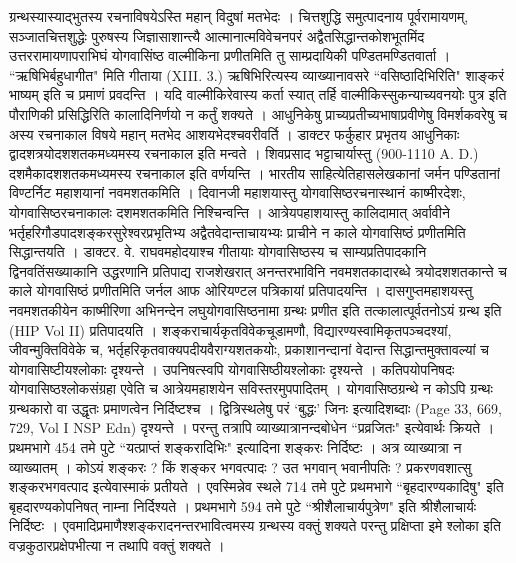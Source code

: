 ग्रन्थस्यास्याद्भुतस्य रचनाविषयेऽस्ति महान् विदुषां मतभेदः । चित्तशुद्धि समुत्पादनाय पूर्वरामायणम्, सञ्जातचित्तशुद्धेः पुरुषस्य जिज्ञासाशान्त्यै आत्मानात्मविवेचनपरं अद्वैतसिद्धान्तकोशभूतमिंद उत्तररामायणापराभिघं योगवासिंष्ठ वाल्मीकिना प्रणीतमिति तु साम्प्रदायिकी पण्डितमण्डितवार्ता । ``ऋषिभिर्बहुधागीत" मिति गीताया (XIII. 3.) ऋषिभिरित्यस्य व्याख्यानावसरे ``वसिष्ठादिभिरिति" शाङ्करं भाष्यम् इति च प्रमाणं प्रवदन्ति । यदि वाल्मीकिरेवास्य कर्ता स्यात् तर्हि वाल्मीकिस्सुकन्याच्यवनयोः पुत्र इति पौराणिकी प्रसिद्धिरिति कालादिनिर्णयो न कर्तुं शक्यते ।
आधुनिकेषु प्राच्यप्रतीच्यभाषाप्रवीणेषु विमर्शकवरेषु च अस्य रचनाकाल विषये महान् मतभेद आशयभेदश्चवरीवर्ति । डाक्टर फर्कुहार प्रभृतय आधुनिकाः द्वादशत्रयोदशशतकमध्यमस्य रचनाकाल इति मन्वते । शिवप्रसाद भट्टाचार्यास्तु (900-1110 A. D.) दशमैकादशशतकमध्यमस्य रचनाकाल इति वर्णयन्ति । भारतीय साहित्येतिहासलेखकानां जर्मन पण्डितानां विण्टर्निट महाशयानां नवमशतकमिति । दिवानजी महाशयास्तु योगवासिष्ठरचनास्थानं काष्मीरदेशः, योगवासिष्ठरचनाकालः दशमशतकमिति निश्चिन्वन्ति । आत्रेयपहाशयास्तु कालिदामात् अर्वावीने भर्तृहरिगौडपादशङ्करसुरेश्वरप्रभृतिभ्य अद्वैतवेदान्ताचायभ्यः प्राचीने न काले योगवासिष्ठं प्रणीतमिति सिद्धान्तयति । डाक्टर. वे. राघवमहोदयाश्च गीतायाः योगवासिष्ठस्य च साम्यप्रतिपादकानि द्विनवतिंसख्याकानि उद्धरणानि प्रतिपाद्य राजशेखरात् अनन्तरभाविनि नवमशतकादारब्धे त्रयोदशशतकान्ते च काले योगवासिष्ठं प्रणीतमिति जर्नल आफ ओरियण्टल पत्रिकायां प्रतिपादयन्ति । दासगुप्तमहाशयस्तु नवमशतकीयेन काष्मीरिणा अभिनन्देन लघुयोगवासिष्ठनामा ग्रन्थः प्रणीत इति तत्कालात्पूर्वतनोऽयं ग्रन्थ इति (HIP Vol II) प्रतिपादयति ।
शङ्कराचार्यकृतविवेकचूडामणौ, विद्यारण्यस्वामिकृतपञ्चदश्यां, जीवन्मुक्तिविवेके च, भर्तृहरिकृतवाक्यपदीयवैराग्यशतकयोः, प्रकाशानन्दानां वेदान्त सिद्धान्तमुक्तावल्यां च योगवासिष्टीयश्लोकाः दृश्यन्ते । उपनिषत्स्वपि योगवासिष्ठीयश्लोकाः दृश्यन्ते । कतिपयोपनिषदः योगवासिष्ठश्लोकसंग्रहा एवेति च आत्रेयमहाशयेन सविस्तरमुपपादितम् ।
योगवासिष्ठग्रन्थे न कोऽपि ग्रन्थः ग्रन्थकारो वा उद्धृतः प्रमाणत्वेन निर्दिष्टश्च । द्वित्रिस्थलेषु परं `बुद्धः' जिनः इत्यादिशब्दाः (Page 33, 669, 729, Vol I NSP Edn) दृश्यन्ते । परन्तु तत्रापि व्याख्यात्रानन्दबोधेन ``प्रव्रजितः" इत्येवार्थः क्रियते । प्रथमभागे 454 तमे पुटे ``यत्प्राप्तं शङ्करादिभिः" इत्यादिना शङ्करः निर्दिष्टः । अत्र व्याख्यात्रा न व्याख्यातम् । कोऽयं शङ्करः ? किं शङ्कर भगवत्पादः ? उत भगवान् भवानीपतिः ? प्रकरणवशात्सु शङ्करभगवत्पाद इत्येवास्माकं प्रतीयते । एवस्मिन्नेव स्थले 714 तमे पुटे प्रथमभागे ``बृहदारण्यकादिषु" इति बृहदारण्यकोपनिषत् नाम्ना निर्दिश्यते । प्रथमभागे 594 तमे पुटे ``श्रीशैलाचार्यपुत्रेण" इति श्रीशैलाचार्यः निर्दिष्टः । एवमादिप्रमाणैश्शङ्करादनन्तरभावित्वमस्य ग्रन्थस्य वक्तुं शक्यते परन्तु प्रक्षिप्ता इमे श्लोका इति वज्रकुठारप्रक्षेपभीत्या न तथापि वक्तुं शक्यते ।
